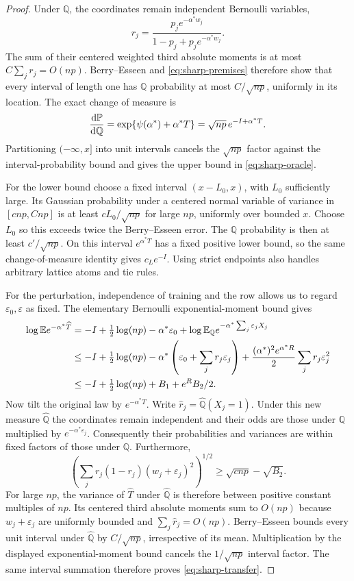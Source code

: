 \begin{proof}
Under $\mathbb{Q}$, the coordinates remain independent Bernoulli variables,
\[
 r_j=\frac{p_je^{-\alpha^*w_j}}{1-p_j+p_je^{-\alpha^*w_j}}.
\]
The sum of their centered weighted third absolute moments is at most
$C\sum_jr_j=O({np})$. Berry--Esseen and
\eqref{eq:sharp-premises} therefore show that every interval of length one
has $\mathbb{Q}$ probability at most $C/\sqrt{np}$, uniformly in
its location. The exact change of measure is
\[
 \frac{\mathrm{d}\mathbb P}{\mathrm{d}\mathbb{Q}}
 =\exp\{\psi(\alpha^*)+\alpha^*T\}
 =\sqrt{np}\,e^{-I+\alpha^*T}.
\]
Partitioning $(-\infty,x]$ into unit intervals cancels the
$\sqrt{np}$ factor against the interval-probability bound and gives
the upper bound in \eqref{eq:sharp-oracle}.

For the lower bound choose a fixed interval $(x-L_0,x)$, with $L_0$
sufficiently large. Its Gaussian probability under a centered normal
variable of variance in $[c{np},C{np}]$ is at least $cL_0/\sqrt {np}$ for large
${np}$, uniformly over bounded $x$. Choose $L_0$ so this exceeds twice the
Berry--Esseen error. The $\mathbb{Q}$ probability is then at least $c'/\sqrt{np}$.
On this interval $e^{\alpha^*T}$ has a fixed positive lower bound,
so the same change-of-measure identity gives $c_Le^{-I}$.
Using strict endpoints also handles arbitrary lattice atoms and tie rules.

For the perturbation, independence of training and the row allows us to
regard $\varepsilon_0,\varepsilon$ as fixed. The elementary Bernoulli exponential-moment bound
gives
\begin{align*}
 \log\mathbb E e^{-\alpha^*\widehat T}
 &= -I+\tfrac12\log(np)-\alpha^*\varepsilon_0+\log\mathbb E_{\mathbb{Q}}e^{-\alpha^*\sum_j\varepsilon_jX_j}\\
 &\le -I+\tfrac12\log(np)-\alpha^*\left(\varepsilon_0+\sum_jr_j\varepsilon_j\right)
       +\frac{(\alpha^*)^2e^{\alpha^*R}}2\sum_jr_j\varepsilon_j^2\\
 &\le -I+\tfrac12\log(np)+B_1+e^R B_2/2.
\end{align*}
Now tilt the original law by $e^{-\alpha^*\widehat T}$.
Write $\widehat r_j=\widehat{\mathbb Q}(X_j=1)$.
Under this new measure $\widehat{\mathbb{Q}}$ the coordinates remain independent and
their odds are those under $\mathbb{Q}$ multiplied by $e^{-\alpha^*\varepsilon_j}$.
Consequently their probabilities and variances are within fixed factors
of those under $\mathbb{Q}$. Furthermore,
\[
 \left(\sum_jr_j(1-r_j)(w_j+\varepsilon_j)^2\right)^{1/2}
 \ge \sqrt{c{np}}-\sqrt{B_2}.
\]
For large ${np}$, the variance of $\widehat T$ under $\widehat{\mathbb{Q}}$ is therefore
between positive constant multiples of ${np}$. Its centered third absolute
moments sum to $O({np})$ because $w_j+\varepsilon_j$ are uniformly bounded and
$\sum_j\widehat r_j=O({np})$. Berry--Esseen bounds every unit interval under
$\widehat{\mathbb{Q}}$ by $C/\sqrt {np}$, irrespective of its mean. Multiplication by the displayed exponential-moment bound
cancels the $1/\sqrt{np}$ interval factor. The same interval summation
therefore proves \eqref{eq:sharp-transfer}.
\end{proof}


